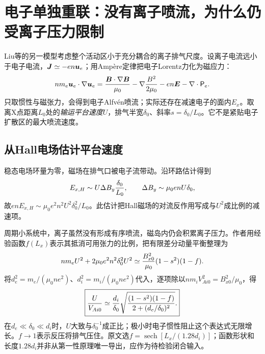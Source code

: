 
\section{电子单独重联：没有离子喷流，为什么仍受离子压力限制}
\label{sec:remaining-erec}
Liu等的另一模型\citep{F741}考虑整个活动区小于充分耦合的离子排气尺度。设离子电流远小于电子电流，$\bm{J}\simeq-en\bm{u}_e$；用Ampère定律把电子Lorentz力化为磁应力：
\begin{equation}
 nm_e\bm{u}_e\cdot\nabla\bm{u}_e
 ={\bm{B}\cdot\nabla\bm{B}\over\mu_0}-\nabla{B^2\over2\mu_0}
 -en\bm{E}-\nabla\cdot\mathsf P_e.
\end{equation}
只取惯性与磁张力，会得到电子Alfvén喷流；实际还存在减速电子的面内$E_x$。取离X点距离$L_0$处的\emph{输运平台速度}$U$，排气半宽$\delta_0$、斜率$s=\delta_0/L_0$。它不是紧贴电子扩散区的最大喷流速度。

\subsection{从Hall电场估计平台速度}
稳态电场环量为零，磁场在排气口被电子流带动。沿环路估计得到
\begin{equation}
 E_{x,H}\sim U\Delta B_y{\delta_0\over L_0},\qquad
 \Delta B_y\sim\mu_0enU\delta_0,
\end{equation}
故$enE_{x,H}\sim\mu_0e^2n^2U^2\delta_0^2/L_0$。此估计把Hall磁场的对流反作用写成与$U^2$成比例的减速项。

周期小系统中，离子虽然没有形成有序喷流，磁岛内仍会积累离子压力。作者用经验函数$f(L_x)$表示其抵消可用张力的比例，把有限差分动量平衡整理为
\begin{equation}
 nm_eU^2+2\mu_0e^2n^2\delta_0^2U^2
 \simeq{B_{x0}^2\over\mu_0}(1-s^2)(1-f).
\end{equation}
将$d_e^2=m_e/(\mu_0ne^2)$、$d_i^2=m_i/(\mu_0ne^2)$代入，逐项除以$nm_iV_{Ai0}^2=B_{x0}^2/\mu_0$，得
\begin{equation}
 \boxed{{U\over V_{Ai0}}\simeq{d_i\over\delta_0}
 \sqrt{{(1-s^2)(1-f)\over2+(d_e/\delta_0)^2}}.}
 \label{eq:remaining-erec-speed}
\end{equation}
在$d_e\ll\delta_0\ll d_i$时，$U$大致与$\delta_0^{-1}$成正比；极小时电子惯性阻止这个表达式无限增长。$f\to1$表示反压将排气压住。原文选$f=\operatorname{sech}[L_x/(1.28d_i)]$；函数形状和长度$1.28d_i$并非从第一性原理唯一导出，应作为待检验闭合输入。

